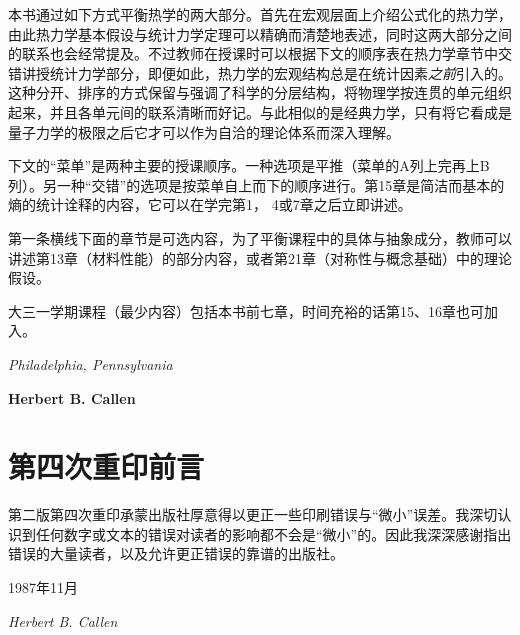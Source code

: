 本书通过如下方式平衡热学的两大部分。首先在宏观层面上介绍公式化的热力学，由此热力学基本假设与统计力学定理可以精确而清楚地表述，同时这两大部分之间的联系也会经常提及。不过教师在授课时可以根据下文的顺序表在热力学章节中交错讲授统计力学部分，即便如此，热力学的宏观结构总是在统计因素{\it 之前}引入的。这种分开、排序的方式保留与强调了科学的分层结构，将物理学按连贯的单元组织起来，并且各单元间的联系清晰而好记。与此相似的是经典力学，只有将它看成是量子力学的极限之后它才可以作为自洽的理论体系而深入理解。

下文的“菜单”是两种主要的授课顺序。一种选项是平推（菜单的A列上完再上B列）。另一种“交错”的选项是按菜单自上而下的顺序进行。第15章是简洁而基本的熵的统计诠释的内容，它可以在学完第1， 4或7章之后立即讲述。

第一条横线下面的章节是可选内容，为了平衡课程中的具体与抽象成分，教师可以讲述第13章（材料性能）的部分内容，或者第21章（对称性与概念基础）中的理论假设。

大三一学期课程（最少内容）包括本书前七章，时间充裕的话第15、16章也可加入。

\begin{flushright}
{\it Philadelphia, Pennsylvania} 

{\bf Herbert B. Callen}
\end{flushright}


\section*{第四次重印前言}
第二版第四次重印承蒙出版社厚意得以更正一些印刷错误与“微小”误差。我深切认识到任何数字或文本的错误对读者的影响都不会是“微小”的。因此我深深感谢指出错误的大量读者，以及允许更正错误的靠谱的出版社。

\begin{flushright}
1987年11月

{\it Herbert B. Callen}
\end{flushright}



